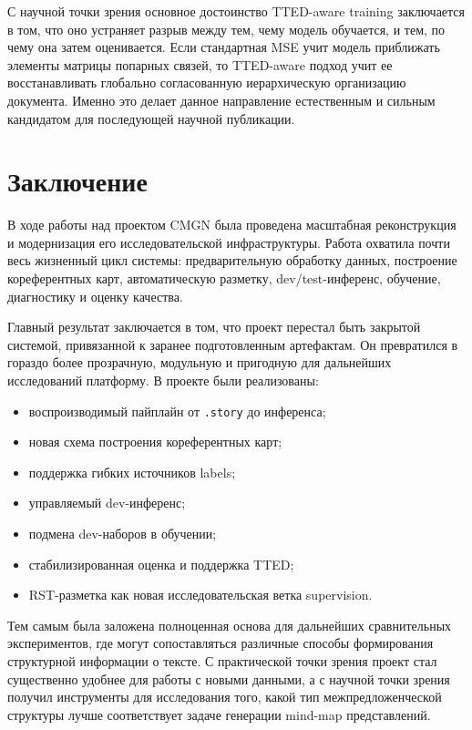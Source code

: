 \documentclass[12pt,a4paper]{article}
\begin{document}
С научной точки зрения основное достоинство TTED-aware training заключается в том, что оно устраняет разрыв между тем, чему модель обучается, и тем, по чему она затем оценивается. Если стандартная MSE учит модель приближать элементы матрицы попарных связей, то TTED-aware подход учит ее восстанавливать глобально согласованную иерархическую организацию документа. Именно это делает данное направление естественным и сильным кандидатом для последующей научной публикации.

\section{Заключение}

В ходе работы над проектом CMGN была проведена масштабная реконструкция и модернизация
его исследовательской инфраструктуры. Работа охватила почти весь жизненный цикл системы:
предварительную обработку данных, построение кореферентных карт, автоматическую разметку,
dev/test-инференс, обучение, диагностику и оценку качества.

Главный результат заключается в том, что проект перестал быть закрытой системой,
привязанной к заранее подготовленным артефактам. Он превратился в гораздо более
прозрачную, модульную и пригодную для дальнейших исследований платформу. В проекте были
реализованы:

\begin{itemize}
    \item воспроизводимый пайплайн от \texttt{.story} до инференса;
    \item новая схема построения кореферентных карт;
    \item поддержка гибких источников labels;
    \item управляемый dev-инференс;
    \item подмена dev-наборов в обучении;
    \item стабилизированная оценка и поддержка TTED;
    \item RST-разметка как новая исследовательская ветка supervision.
\end{itemize}

Тем самым была заложена полноценная основа для дальнейших сравнительных экспериментов,
где могут сопоставляться различные способы формирования структурной информации о тексте.
С практической точки зрения проект стал существенно удобнее для работы с новыми данными,
а с научной точки зрения получил инструменты для исследования того, какой тип
межпредложенческой структуры лучше соответствует задаче генерации mind-map представлений.
\end{document}
